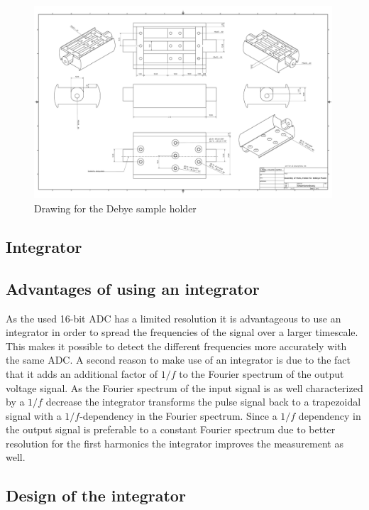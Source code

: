    
   \begin{figure}
\includegraphics[width=0.99\textwidth]{figures/Gesamtanordnung.pdf}
    \caption{Drawing for the Debye sample holder}
    \label{fig.CADdrawing}
   \end{figure}

\subsection{Integrator}
\subsection{Advantages of using an integrator}
As the used 16-bit ADC has a limited resolution it is advantageous to use an integrator in order to spread the frequencies of the signal over a larger timescale. This makes it possible to detect the different frequencies more accurately with the same ADC. 
A second reason to make use of an integrator is due to the fact that it adds an additional factor of $1/f$ to the Fourier spectrum of the output voltage signal. As the Fourier spectrum of the input signal is as well characterized by a $1/f$ decrease the integrator transforms the pulse signal back to a trapezoidal signal with a $1/f$-dependency in the Fourier spectrum. Since a $1/f$ dependency in the output signal is preferable to a constant Fourier spectrum due to better resolution for the first harmonics the integrator improves the measurement as well. 

\subsection{Design of the integrator}
